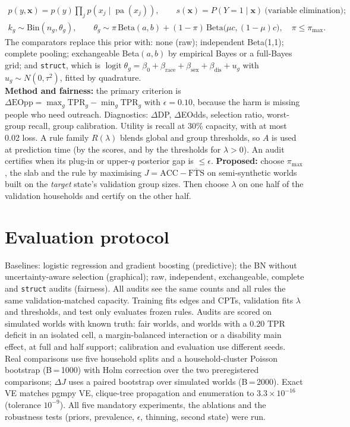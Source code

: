 \documentclass[11pt,a4paper]{article}
\begin{document}
\vspace{-8pt}\begin{gather*}
p(y,\mathbf{x})=p(y)\textstyle\prod_{j}p(x_j\mid\operatorname{pa}(x_j)),\qquad s(\mathbf{x})=P(Y{=}1\mid\mathbf{x})\ \text{(variable elimination)};\\
k_g\sim\text{Bin}(n_g,\theta_g),\qquad \theta_g\sim\pi\,\text{Beta}(a,b)+(1-\pi)\,\text{Beta}\big(\mu c,(1-\mu)c\big),\quad\pi\le\pi_{\max}.
\end{gather*}\vspace{-2pt}
The comparators replace this prior with: none (raw); independent Beta(1,1); complete pooling; exchangeable Beta$(a,b)$
by empirical Bayes or a full-Bayes grid; and \texttt{struct}, which is
$\operatorname{logit}\theta_g=\beta_0+\beta_{\text{race}}+\beta_{\text{sex}}+\beta_{\text{dis}}+u_g$ with
$u_g\sim N(0,\tau^2)$, fitted by quadrature.\\
\textbf{Method and fairness:} the primary criterion is $\Delta\text{EOpp}=\max_g\text{TPR}_g-\min_g\text{TPR}_g$ with
$\epsilon=0.10$, because the harm is missing people who need outreach. Diagnostics: $\Delta$DP, $\Delta$EOdds, selection
ratio, worst-group recall, group calibration. Utility is recall at 30\% capacity, with at most 0.02
loss. A rule family $R(\lambda)$ blends global and group thresholds, so $A$ is used at prediction time (by the scores,
and by the thresholds for $\lambda>0$). An audit certifies when its plug-in or upper-$q$ posterior gap is $\le\epsilon$.
\textbf{Proposed:} choose $\pi_{\max}$, the slab and the rule by maximising $J=\text{ACC}-\overline{\text{FTS}}$ on
semi-synthetic worlds built on the \emph{target} state's validation group sizes. Then choose $\lambda$ on one half of
the validation households and certify on the other half.

\section{Evaluation protocol}
Baselines: logistic regression and gradient boosting (predictive); the BN without uncertainty-aware selection
(graphical); raw, independent, exchangeable, complete and \texttt{struct} audits (fairness). All audits see the same
counts and all rules the same validation-matched capacity. Training fits edges and CPTs, validation fits $\lambda$ and
thresholds, and test only evaluates frozen rules. Audits are scored on simulated worlds with known truth: fair worlds,
and worlds with a 0.20 TPR deficit in an isolated cell, a margin-balanced interaction or a disability main effect, at
full and half support; calibration and evaluation use different seeds. Real comparisons use five household splits and
a household-cluster Poisson bootstrap (B\,=\,1000) with Holm correction over the two preregistered comparisons;
$\Delta J$ uses a paired bootstrap over simulated worlds (B\,=\,2000). Exact VE matches pgmpy VE, clique-tree
propagation and enumeration to $3.3\times10^{-16}$ (tolerance $10^{-9}$). All five mandatory experiments, the
ablations and the robustness tests (priors, prevalence, $\epsilon$, thinning, second state) were run.
\end{document}
